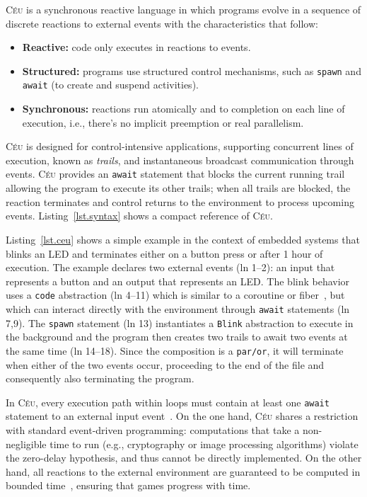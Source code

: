 \documentclass[10pt, conference, compsocconf]{IEEEtran}
\newcommand{\CEU}{\textsc{C\'{e}u}\xspace}
\newcommand{\code}[1] {{\small{\texttt{#1}}}}
\begin{document}
\CEU is a synchronous reactive language in which programs evolve in a sequence
of discrete reactions to external events with the characteristics that follow:
%
\begin{itemize}
\item \textbf{Reactive:} code only executes in reactions to events.
\item \textbf{Structured:} programs use structured control mechanisms, such as
    \code{spawn} and \code{await} (to create and suspend activities).
\item \textbf{Synchronous:} reactions run atomically and to completion on each line of
    execution, i.e., there's no implicit preemption or real parallelism.
\end{itemize}
%
\CEU is designed for control-intensive applications, supporting concurrent
lines of execution, known as \emph{trails}, and instantaneous broadcast
communication through events.
%
%
%
\CEU provides an \code{await} statement that blocks the current running trail
allowing the program to execute its other trails; when all trails are blocked,
the reaction terminates and control returns to the environment to process
upcoming events.
%
Listing~\ref{lst.syntax} shows a compact reference of \CEU.

Listing~\ref{lst.ceu} shows a simple example in the context of embedded systems
that blinks an LED and terminates either on a button press or after 1 hour of
execution.
%
The example declares two external events (ln 1--2): an input that represents
a button and an output that represents an LED.
%
The blink behavior uses a \code{code} abstraction (ln 4--11) which is similar
to a coroutine or fiber~\cite{sync_async.cooperative}, but which can interact
directly with the environment through \code{await} statements (ln 7,9).
%
The \code{spawn} statement (ln 13) instantiates a \code{Blink} abstraction to
execute in the background and the program then creates two trails to await
two events at the same time (ln 14--18).
Since the composition is a \code{par/or}, it will terminate when either of the
two events occur, proceeding to the end of the file and consequently also
terminating the program.

In \CEU, every execution path within loops must contain at least one
\code{await} statement to an external input
event~\cite{ceu.sensys13,esterel.primer}.
%
On the one hand, \CEU shares a restriction with standard event-driven
programming: computations that take a non-negligible time to run (e.g.,
cryptography or image processing algorithms) violate the zero-delay hypothesis,
and thus cannot be directly implemented.
%
On the other hand, all reactions to the external environment are guaranteed to
be computed in bounded time~\cite{ceu.lctes18}, ensuring that games progress
with time.
\end{document}
